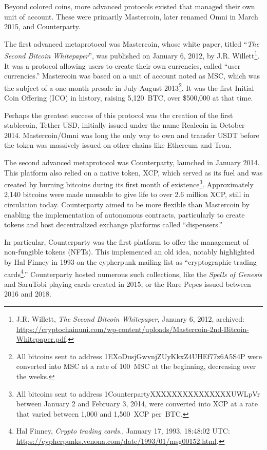 \documentclass[
  a5paper,
  smalldemyvopaper,10pt,twoside,onecolumn,openright,extrafontsizes,hidelinks]{memoir}
\begin{document}
Beyond colored coins, more advanced protocols existed that managed their
own unit of account. These were primarily Mastercoin, later renamed Omni
in March 2015, and Counterparty.

The first advanced metaprotocol was Mastercoin, whose white paper,
titled ``\emph{The Second Bitcoin Whitepaper}'', was published on
January 6, 2012, by J.R. Willett\footnote{J.R. Willett, \emph{The Second
  Bitcoin Whitepaper}, January 6, 2012, archived:
  \url{https://cryptochainuni.com/wp-content/uploads/Mastercoin-2nd-Bitcoin-Whitepaper.pdf}.}.
It was a protocol allowing users to create their own currencies, called
``user currencies.'' Mastercoin was based on a unit of account noted as
MSC, which was the subject of a one-month presale in July-August
2013\footnote{All bitcoins sent to address
  1EXoDusjGwvnjZUyKkxZ4UHEf77z6A5S4P were converted into MSC at a rate
  of 100~MSC at the beginning, decreasing over the weeks.}. It was the
first Initial Coin Offering (ICO) in history, raising 5,120~BTC, over
\$500,000 at that time.

Perhaps the greatest success of this protocol was the creation of the
first stablecoin, Tether USD, initially issued under the name Realcoin
in October 2014. Mastercoin/Omni was long the only way to own and
transfer USDT before the token was massively issued on other chains like
Ethereum and Tron.

The second advanced metaprotocol was Counterparty, launched in January
2014. This platform also relied on a native token, XCP, which served as
its fuel and was created by burning bitcoins during its first month of
existence\footnote{All bitcoins sent to address
  1CounterpartyXXXXXXXXXXXXXXXUWLpVr between January 2 and February 3,
  2014, were converted into XCP at a rate that varied between 1,000 and
  1,500~XCP per~BTC.}. Approximately 2,140 bitcoins were made unusable
to give life to over 2.6 million XCP, still in circulation today.
Counterparty aimed to be more flexible than Mastercoin by enabling the
implementation of autonomous contracts, particularly to create tokens
and host decentralized exchange platforms called ``dispensers.''

In particular, Counterparty was the first platform to offer the
management of non-fungible tokens (NFTs). This implemented an old idea,
notably highlighted by Hal Finney in 1993 on the cypherpunk mailing list
as ``cryptographic trading cards\footnote{Hal Finney, \emph{Crypto
  trading cards.}, January 17, 1993, 18:48:02 UTC:
  \url{https://cypherpunks.venona.com/date/1993/01/msg00152.html}.}.''
Counterparty hosted numerous such collections, like the \emph{Spells of
Genesis} and SaruTobi playing cards created in 2015, or the Rare Pepes
issued between 2016 and 2018.
\end{document}
